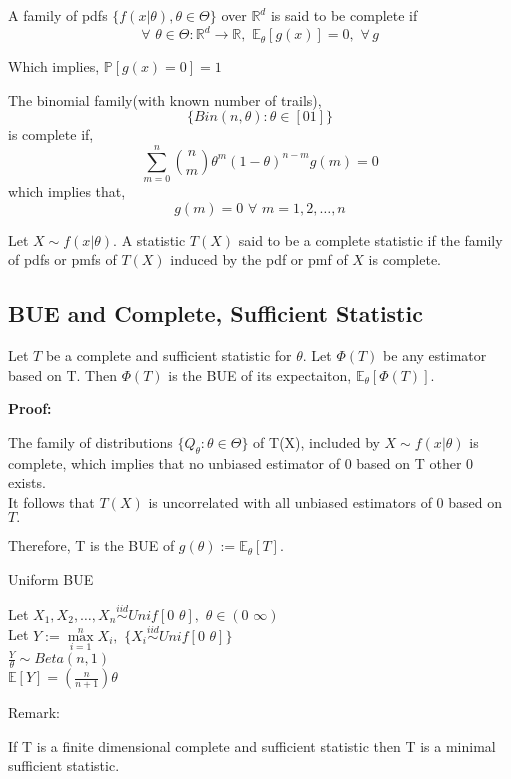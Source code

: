 \documentclass[12pt,a4paper]{article}
\begin{document}
\begin{defn}
A family of pdfs $\{f(x|\theta),\theta \in \Theta \}$ over $\mathbb{R}^d$ is said to be complete if
$$\forall\,\, \theta\in \Theta : \mathbb{R}^d\rightarrow \mathbb{R}, \,\, \mathbb{E}_\theta[g(x)]=0, \,\, \forall\, g$$
\end{defn}
\begin{center}
Which implies,  $\mathbb{P}[g(x)=0]=1$ 
\end{center} 
\begin{exmp}

The binomial family(with known number of trails),
$$\{Bin(n,\theta): \theta\in[0 1]\}$$ is complete if, $$\sum \limits_{m=0}^n {n \choose m}\theta^m(1-\theta)^{n-m} g(m)=0 $$
which implies that, $$g(m)=0\,\, \forall \,\, m=1,2,\dots,n$$
\end{exmp}
\begin{defn}
Let $X \sim f(x|\theta)$. A statistic $T(X)$ said to be a complete statistic if the family of pdfs or pmfs of $T(X)$ induced by the pdf or pmf of $X$ is complete. 
\end{defn}
\subsection{BUE and Complete, Sufficient Statistic}
\begin{thm}
Let $T$ be a complete and sufficient statistic for $\theta.$ Let $\Phi(T)$ be any estimator based on T. Then $\Phi(T)$ is the BUE of its expectaiton, $\mathbb{E}_\theta[\Phi(T)].$
\end{thm}
\begin{flushleft}
\textbf{Proof:}
\end{flushleft}
The family of distributions $ \{ Q_ \theta: \theta \in \Theta \}$ of T(X), included by $X \sim f(x| \theta)$ is complete, which implies that no unbiased estimator of 0 based on T other 0 exists.\\
It follows that $T(X)$ is uncorrelated with all unbiased estimators of 0 based on $T.$
\begin{center}
Therefore, T is the BUE of $g(\theta):=\mathbb{E}_\theta[T].$ 
\end{center}
\begin{exmp} Uniform BUE
\begin{center}
Let $X_1,X_2,\dots,X_n \overset{iid}{\sim} Unif[0 \,\,\theta], \,\, \theta\in(0\,\, \infty)$\\
Let $Y:=\max\limits_{i=1}^n X_i, \,\, \{X_i\overset{iid}{\sim}Unif[0\,\,\theta]\} $\\ 
\hfill \break
$\displaystyle{ \frac{Y}{\theta} \sim Beta(n,1)}$\\
\hfill \break
$\mathbb{E}[Y]=(\frac{n}{n+1}) \theta $
\end{center}
\end{exmp}
Remark:\\
\begin{rem}
If T is a finite dimensional complete and sufficient statistic then T is a minimal sufficient statistic. 
\end{rem}
\end{document}
